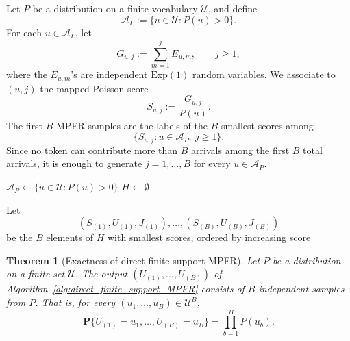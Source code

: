 \documentclass{article}
\theoremstyle{plain}
\newtheorem{theorem}{Theorem}[section]
\theoremstyle{definition}
\begin{document}
Let $P$ be a distribution on a finite vocabulary $\mathcal U$, and define
\[
\mathcal A_P:=\{u\in\mathcal U:P(u)>0\}.
\]
For each $u\in\mathcal A_P$, let
\[
G_{u,j}:=\sum_{m=1}^{j}E_{u,m},\qquad j\geq 1,
\]
where the $E_{u,m}$'s are independent $\mathrm{Exp}(1)$ random variables. 
We associate to $(u,j)$ the mapped-Poisson score
\[
S_{u,j}:=\frac{G_{u,j}}{P(u)}.
\]
The first $B$ MPFR samples are the labels of the $B$ smallest scores among
\[
\{S_{u,j}:u\in\mathcal A_P,\ j\geq 1\}.
\]
Since no token can contribute more than $B$ arrivals among the first $B$ total arrivals, it is enough to generate $j=1,\ldots,B$ for every $u\in\mathcal A_P$.


\begin{algorithm}[tbp]
\SetAlgoLined
\DontPrintSemicolon
\SetAlgoNoEnd
{}


$\mathcal A_P\gets\{u\in\mathcal U:P(u)>0\}$\;
$H\gets\emptyset$


Let
\[
(S_{(1)},U_{(1)},J_{(1)}),\ldots,(S_{(B)},U_{(B)},J_{(B)})
\]
be the $B$ elements of $H$ with smallest scores, ordered by increasing score\;


\caption{Direct finite-support implementation of $B$-sample MPFR}
\label{alg:direct_finite_support_MPFR}
\end{algorithm}

\begin{theorem}[Exactness of direct finite-support MPFR]
\label{thm::direct_MPFR_exactness}
Let $P$ be a distribution on a finite set $\mathcal U$. 
The output $(U_{(1)},\ldots,U_{(B)})$ of Algorithm~\ref{alg:direct_finite_support_MPFR} consists of $B$ independent samples from $P$. 
That is, for every $(u_1,\ldots,u_B)\in\mathcal U^B$,
\[
\mathbf P\{U_{(1)}=u_1,\ldots,U_{(B)}=u_B\}
=
\prod_{b=1}^B P(u_b).
\]
\end{theorem}
\end{document}
